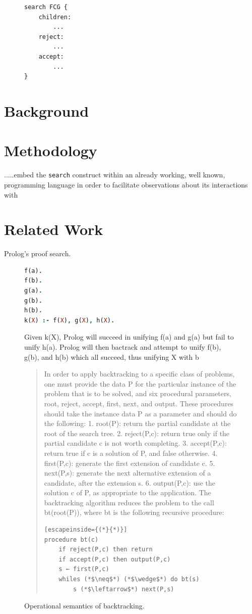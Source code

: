 \documentclass[runningheads]{llncs}
\newcommand{\code}[1]{\texttt{#1}}
\begin{document}
\begin{figure}
\begin{lstlisting}[language=golang, style=boxed]
search FCG {
	children:
		...
	reject:
		...
	accept:
		...
}
\end{lstlisting}
\end{figure}

\section{Background}

\section{Methodology}
.....embed the \code{search} construct within an already working, well known, programming language in order to facilitate observations about its interactions with 

\section{Related Work}
Prolog's proof search.

\begin{figure}
\begin{lstlisting}[language=Prolog]
f(a). 
f(b).
g(a). 
g(b).
h(b).
k(X) :- f(X), g(X), h(X).
\end{lstlisting}
\caption{Given k(X), Prolog will succeed in unifying f(a) and g(a) but fail to unify h(a). Prolog will then bactrack and attempt to unify f(b), g(b), and h(b) which all succeed, thus unifying X with b}
\end{figure}

\begin{figure}
\begin{quotation}
In order to apply backtracking to a specific class of problems, one must provide the data P for the particular instance of the problem that is to be solved, and six procedural parameters, root, reject, accept, first, next, and output. These procedures should take the instance data P as a parameter and should do the following:
1. root(P): return the partial candidate at the root of the search tree.
2. reject(P,c): return true only if the partial candidate c is not worth completing.
3. accept(P,c): return true if c is a solution of P, and false otherwise.
4. first(P,c): generate the first extension of candidate c.
5. next(P,s): generate the next alternative extension of a candidate, after the extension s.
6. output(P,c): use the solution c of P, as appropriate to the application.
The backtracking algorithm reduces the problem to the call bt(root(P)), where bt is the following recursive procedure:
\begin{lstlisting}[escapeinside={(*}{*)}]
procedure bt(c)
	if reject(P,c) then return
	if accept(P,c) then output(P,c)
	s ← first(P,c)
	whiles (*$\neq$*) (*$\wedge$*) do bt(s)
		s (*$\leftarrow$*) next(P,s)
\end{lstlisting}
\caption{Operational semantics of backtracking.\cite{wikipediaBacktrack}}
\end{quotation}
\end{figure}
\end{document}
